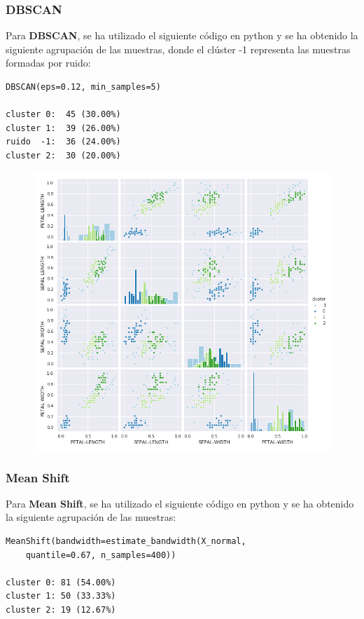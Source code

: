 \documentclass[spanish]{beamer}
\begin{document}
\begin{frame}[fragile]
\frametitle{DBSCAN}
Para \textbf{DBSCAN}, se ha utilizado el siguiente código en python y se ha obtenido la siguiente agrupación de las muestras, donde el clúster -1 representa las muestras formadas por ruido:\break
\begin{lstlisting}
DBSCAN(eps=0.12, min_samples=5)

cluster 0:  45 (30.00%)
cluster 1:  39 (26.00%)
ruido  -1:  36 (24.00%)
cluster 2:  30 (20.00%)
\end{lstlisting}
\end{frame}

\begin{frame}
\begin{figure}[h]
\centering
\includegraphics[scale=0.34]{dani/scatmatrixDBSCANIRIS.png}
\end{figure}
\end{frame}

\begin{frame}[fragile]
\frametitle{Mean Shift}
Para \textbf{Mean Shift}, se ha utilizado el siguiente código en python y se ha obtenido la siguiente agrupación de las muestras:\break
\begin{lstlisting}
MeanShift(bandwidth=estimate_bandwidth(X_normal, 
	quantile=0.67, n_samples=400))

cluster 0: 81 (54.00%)
cluster 1: 50 (33.33%)
cluster 2: 19 (12.67%)
\end{lstlisting}
\end{frame}
\end{document}

